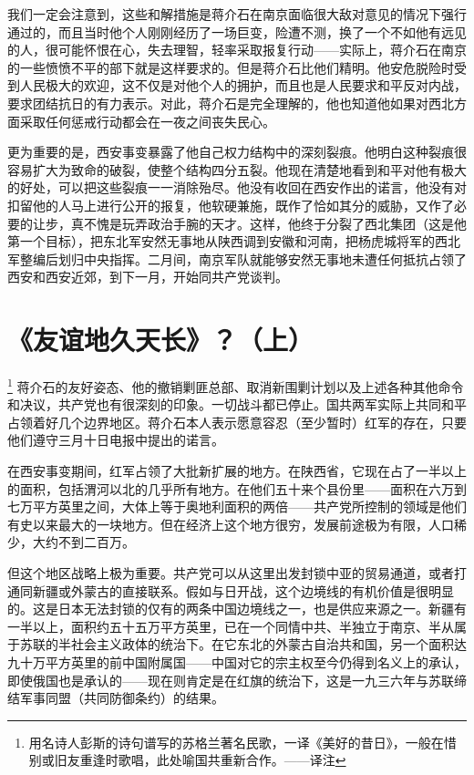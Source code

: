 \documentclass[10pt]{book}
\begin{document}
我们一定会注意到，这些和解措施是蒋介石在南京面临很大敌对意见的情况下强行通过的，而且当时他个人刚刚经历了一场巨变，险遭不测，换了一个不如他有远见的人，很可能怀恨在心，失去理智，轻率采取报复行动——实际上，蒋介石在南京的一些愤愤不平的部下就是这样要求的。但是蒋介石比他们精明。他安危脱险时受到人民极大的欢迎，这不仅是对他个人的拥护，而且也是人民要求和平反对内战，要求团结抗日的有力表示。对此，蒋介石是完全理解的，他也知道他如果对西北方面采取任何惩戒行动都会在一夜之间丧失民心。

更为重要的是，西安事变暴露了他自己权力结构中的深刻裂痕。他明白这种裂痕很容易扩大为致命的破裂，使整个结构四分五裂。他现在清楚地看到和平对他有极大的好处，可以把这些裂痕一一消除殆尽。他没有收回在西安作出的诺言，他没有对扣留他的人马上进行公开的报复，他软硬兼施，既作了恰如其分的威胁，又作了必要的让步，真不愧是玩弄政治手腕的天才。这样，他终于分裂了西北集团（这是他第一个目标），把东北军安然无事地从陕西调到安徽和河南，把杨虎城将军的西北军整编后划归中央指挥。二月间，南京军队就能够安然无事地未遭任何抵抗占领了西安和西安近郊，到下一月，开始同共产党谈判。



\section{《友谊地久天长》？（上）}

\footnote{用名诗人彭斯的诗句谱写的苏格兰著名民歌，一译《美好的昔日》，一般在惜别或旧友重逢时歌唱，此处喻国共重新合作。——译注}
蒋介石的友好姿态、他的撤销剿匪总部、取消新围剿计划以及上述各种其他命令和决议，共产党也有很深刻的印象。一切战斗都已停止。国共两军实际上共同和平占领着好几个边界地区。蒋介石本人表示愿意容忍（至少暂时）红军的存在，只要他们遵守三月十日电报中提出的诺言。

在西安事变期间，红军占领了大批新扩展的地方。在陕西省，它现在占了一半以上的面积，包括渭河以北的几乎所有地方。在他们五十来个县份里——面积在六万到七万平方英里之间，大体上等于奥地利面积的两倍——共产党所控制的领域是他们有史以来最大的一块地方。但在经济上这个地方很穷，发展前途极为有限，人口稀少，大约不到二百万。

但这个地区战略上极为重要。共产党可以从这里出发封锁中亚的贸易通道，或者打通同新疆或外蒙古的直接联系。假如与日开战，这个边境线的有机价值是很明显的。这是日本无法封锁的仅有的两条中国边境线之一，也是供应来源之一。新疆有一半以上，面积约五十五万平方英里，已在一个同情中共、半独立于南京、半从属于苏联的半社会主义政体的统治下。在它东北的外蒙古自治共和国，另一个面积达九十万平方英里的前中国附属国——中国对它的宗主权至今仍得到名义上的承认，即使俄国也是承认的——现在则肯定是在红旗的统治下，这是一九三六年与苏联缔结军事同盟（共同防御条约）的结果。
\end{document}
